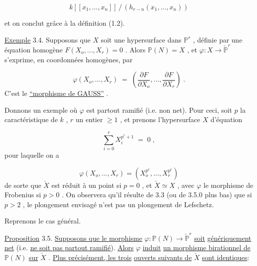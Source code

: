 \begin{equation}\tag{3.3.16}
k[[x_1,\dots,x_n]] \,/\, (h_{r-n}(x_1,\dots,x_n)) 
\end{equation}


 et on conclut grâce à la définition (1.2).

\underline{Exemple} 3.4. Supposons que $X$ soit une hypersurface dans $\mathbb{P}^r$ , définie par une équation homogène $F(X_o,\dots,X_r) = 0$ . Alors $\mathbb{P}(N) = X$ , et $\varphi : X \longrightarrow \check{\mathbb{P}}^r$ s'exprime, en coordonnées homogènes, par

\begin{equation}\tag{3.4.1}
\varphi(X_o,\dots,X_r) \;=\; \left( \frac{\partial F}{\partial X_o},\dots, \frac{\partial F}{\partial X_r} \right) \;.
\end{equation}
C'est le \underline{``morphisme de GAUSS''} .

Donnons un exemple où $\varphi$ est partout ramifié (i.e. non net). Pour ceci, soit $p$ la caractéristique de $k$ , $r$ un entier $\geqslant 1$ , et prenons l'hypersurface $X$ d'équation

\begin{equation}\tag{3.4.2}
\sum_{i=0}^{r} X_i^{p^r+1} \;=\; 0 \;,
\end{equation}
pour laquelle on a

\begin{equation}\tag{3.4.3}
\varphi(X_o,\dots,X_r) = (X_o^{p^r},\dots,X_r^{p^r})
\end{equation}
de sorte que $\check{X}$ est réduit à un point si $p = 0$ , et $\check{X} \simeq X$ , avec $\varphi$ le morphisme de Frobenius si $p > 0$ . On observera qu'il résulte de 3.3 (ou de 3.5.0 plus bas) que si $p > 2$ , le plongement envisagé n'est pas un plongement de Lefschetz.

Reprenons le cas général.



\underline{Proposition} 3.5. \underline{Supposons que le morphisme} $\varphi : \mathbb{P}(N) \longrightarrow \check{\mathbb{P}}^r$ \underline{soit} \underline{génériquement net} (i.e. \underline{ne soit pas partout ramifié}). \underline{Alors} $\varphi$ \underline{induit} \underline{un morphisme birationnel de} $\mathbb{P}(N)$ \underline{sur} $\check{X}$ . \underline{Plus précisément, les trois} \underline{ouverts suivants de} $\check{X}$ \underline{sont identiques}:

